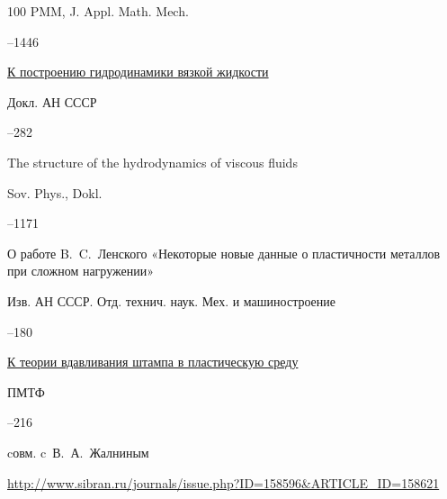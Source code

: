 \begin{thebibliography}{100}
\jour PMM, J. Appl. Math. Mech. 


--1446 






\paper \href{https://zbmath.org/?q=an:0100.21403}{К построению гидродинамики вязкой жидкости}

\jour Докл. АН СССР




–282


\transl


\paper The structure of the hydrodynamics of viscous fluids

\jour Sov. Phys., Dokl. 


--1171 





\paper О работе B.~C.~Ленского «Некоторые новые данные о пластичности металлов при сложном нагружении» 

\jour Изв. АН СССР. Отд. технич. наук. Мех. и машиностроение



–180






\paper \href{https://zbmath.org/?q=an:0101.17304}{К теории вдавливания штампа в пластическую среду}

\jour ПМТФ



–216 

\miscnote cовм. c~В.~А.~Жалниным


\elink \url{http://www.sibran.ru/journals/issue.php?ID=158596&ARTICLE_ID=158621}




\end{thebibliography}
